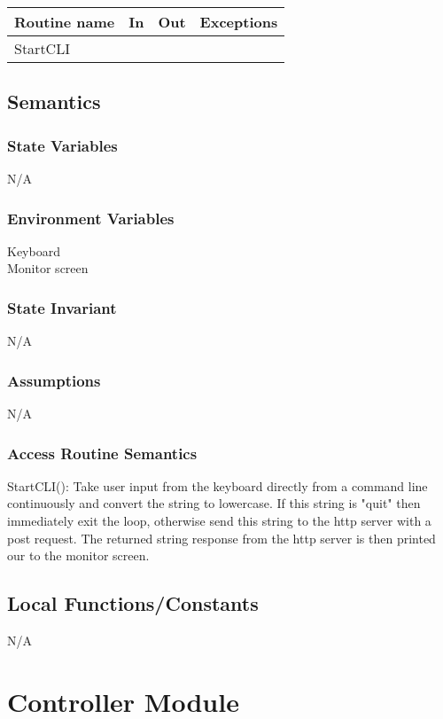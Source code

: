\documentclass[12pt]{article}
\begin{document}
\begin{tabular}{| l | l | l | l |}
\hline
\textbf{Routine name} & \textbf{In} & \textbf{Out} & \textbf{Exceptions}\\
\hline
StartCLI & & & \\
\hline
\end{tabular}

\subsection {Semantics}

\subsubsection {State Variables}
N/A
\subsubsection {Environment Variables}
Keyboard\\
Monitor screen
\subsubsection {State Invariant}
N/A
\subsubsection {Assumptions}
N/A

\subsubsection{Access Routine Semantics}
\noindent StartCLI(): Take user input from the keyboard directly from a command line continuously and convert the string to lowercase. If this string is "quit" then immediately exit the loop, otherwise send this string to the http server with a post request. The returned string response from the http server is then printed our to the monitor screen.\\

\subsection{Local Functions/Constants}
N/A

\newpage

\section {Controller Module}
\end{document}
